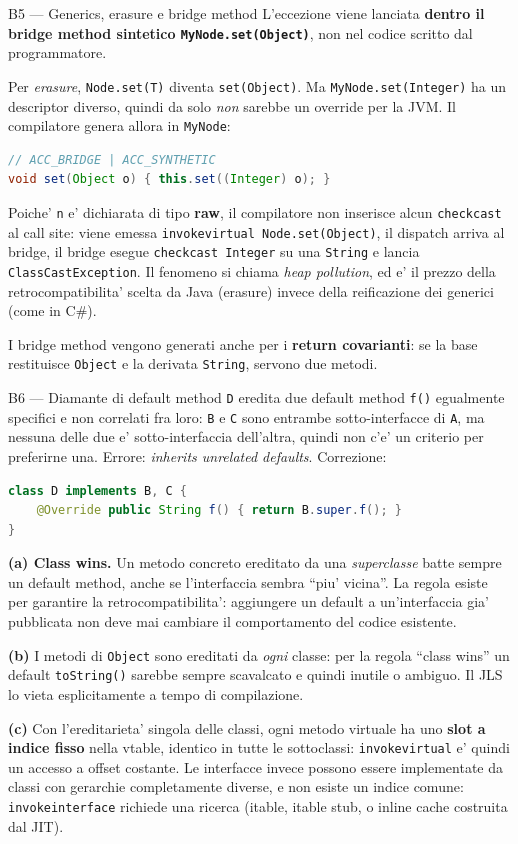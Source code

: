 \documentclass{report}
\newcommand{\code}[1]{\texttt{\small #1}}
\begin{document}
\begin{soluzione}{B5 --- Generics, erasure e bridge method}
\label{sol:B5}
L'eccezione viene lanciata \textbf{dentro il bridge method sintetico
\code{MyNode.set(Object)}}, non nel codice scritto dal programmatore.

Per \emph{erasure}, \code{Node.set(T)} diventa \code{set(Object)}. Ma
\code{MyNode.set(Integer)} ha un descriptor diverso, quindi da solo
\emph{non} sarebbe un override per la JVM. Il compilatore genera allora in
\code{MyNode}:
\begin{lstlisting}[language=Java]
// ACC_BRIDGE | ACC_SYNTHETIC
void set(Object o) { this.set((Integer) o); }
\end{lstlisting}
Poiche' \code{n} e' dichiarata di tipo \textbf{raw}, il compilatore non inserisce
alcun \code{checkcast} al call site: viene emessa
\code{invokevirtual Node.set(Object)}, il dispatch arriva al bridge, il bridge
esegue \code{checkcast Integer} su una \code{String} e lancia
\code{ClassCastException}. Il fenomeno si chiama \emph{heap pollution}, ed e' il
prezzo della retrocompatibilita' scelta da Java (erasure) invece della
reificazione dei generici (come in C\#).

I bridge method vengono generati anche per i \textbf{return covarianti}: se la
base restituisce \code{Object} e la derivata \code{String}, servono due metodi.
\end{soluzione}

\begin{soluzione}{B6 --- Diamante di default method}
\label{sol:B6}
\code{D} eredita due default method \code{f()} egualmente specifici e non
correlati fra loro: \code{B} e \code{C} sono entrambe sotto-interfacce di
\code{A}, ma nessuna delle due e' sotto-interfaccia dell'altra, quindi non c'e'
un criterio per preferirne una. Errore: \emph{inherits unrelated defaults}.
Correzione:
\begin{lstlisting}[language=Java]
class D implements B, C {
    @Override public String f() { return B.super.f(); }
}
\end{lstlisting}

\textbf{(a) Class wins.} Un metodo concreto ereditato da una \emph{superclasse}
batte sempre un default method, anche se l'interfaccia sembra ``piu' vicina''.
La regola esiste per garantire la retrocompatibilita': aggiungere un default a
un'interfaccia gia' pubblicata non deve mai cambiare il comportamento del codice
esistente.

\textbf{(b)} I metodi di \code{Object} sono ereditati da \emph{ogni} classe:
per la regola ``class wins'' un default \code{toString()} sarebbe sempre
scavalcato e quindi inutile o ambiguo. Il JLS lo vieta esplicitamente a tempo di
compilazione.

\textbf{(c)} Con l'ereditarieta' singola delle classi, ogni metodo virtuale ha
uno \textbf{slot a indice fisso} nella vtable, identico in tutte le
sottoclassi: \code{invokevirtual} e' quindi un accesso a offset costante. Le
interfacce invece possono essere implementate da classi con gerarchie
completamente diverse, e non esiste un indice comune: \code{invokeinterface}
richiede una ricerca (itable, itable stub, o inline cache costruita dal JIT).
\end{soluzione}
\end{document}
